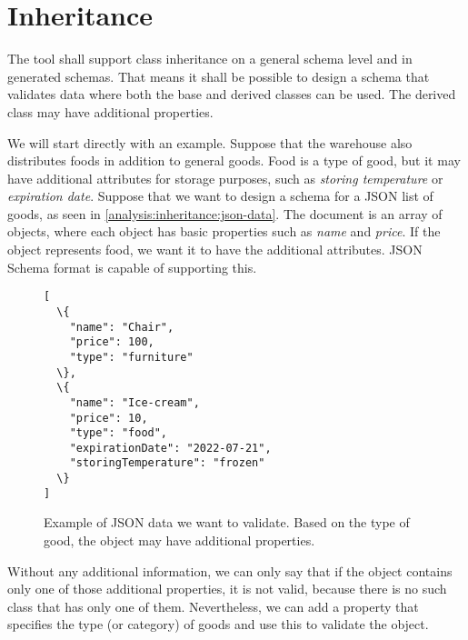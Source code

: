

\section{Inheritance}

\begin{requirement}
    The tool shall support class inheritance on a general schema level and in generated schemas. That means it shall be possible to design a schema that validates data where both the base and derived classes can be used. The derived class may have additional properties.
    \label{requirement:inheritance}
\end{requirement}

\begin{showcase}
  We will start directly with an example. Suppose that the warehouse also distributes foods in addition to general goods. Food is a type of good, but it may have additional attributes for storage purposes, such as \textit{storing temperature} or \textit{expiration date}. Suppose that we want to design a schema for a JSON list of goods, as seen in \autoref{analysis:inheritance:json-data}. The document is an array of objects, where each object has basic properties such as \textit{name} and \textit{price}. If the object represents food, we want it to have the additional attributes. JSON Schema format is capable of supporting this.

  \begin{figure}[H]\centering
      \begin{Verbatim}[commandchars=\\\{\}]
[
  \{
    "name": "Chair",
    "price": 100,
    "type": "furniture"
  \},
  \{
    "name": "Ice-cream",
    "price": 10,
    "type": "food",
    "expirationDate": "2022-07-21",
    "storingTemperature": "frozen"
  \}
]
      \end{Verbatim}
      \caption{Example of JSON data we want to validate. Based on the type of good, the object may have additional properties.}
      \label{analysis:inheritance:json-data}
  \end{figure}

    Without any additional information, we can only say that if the object contains only one of those additional properties, it is not valid, because there is no such class that has only one of them. Nevertheless, we can add a property that specifies the type (or category) of goods and use this to validate the object.
\end{showcase}

